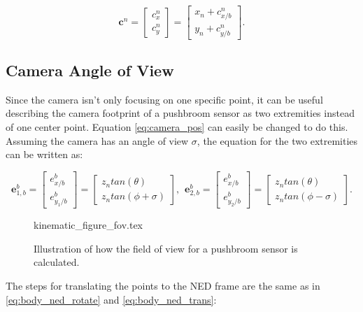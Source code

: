 \begin{equation} \label{eq:body_ned_trans}
	\bm{c}^n =
	\begin{bmatrix}
		c_x^n \\ c_y^n
	\end{bmatrix}
	=
	\begin{bmatrix}
		x_n + c_{x/b}^n \\
		y_n + c_{y/b}^n
	\end{bmatrix}.
\end{equation}

\subsection{Camera Angle of View}
Since the camera isn't only focusing on one specific point, it can be useful describing the camera footprint of a pushbroom sensor as two extremities instead of one center point. Equation \eqref{eq:camera_pos} can easily be changed to do this. Assuming the camera has an angle of view $\sigma$, the equation for the two extremities can be written as:

\begin{equation}
	\bm{e}_{1,b}^b = 
	\begin{bmatrix}
		e^b_{x/b} \\ e^b_{y_1/b}
	\end{bmatrix}
	=
	\begin{bmatrix}
		z_n tan(\theta)\\
		z_n tan(\phi + \sigma)
	\end{bmatrix}
	, \hspace{5pt}
	\bm{e}_{2,b}^b = 
	\begin{bmatrix}
		e^b_{x/b} \\ e^b_{y_2/b}
	\end{bmatrix}
	=
	\begin{bmatrix}
		z_n tan(\theta)\\
		z_n tan(\phi - \sigma)
	\end{bmatrix}.
\end{equation}

\begin{figure}
	{kinematic_figure_fov.tex}
	\caption{Illustration of how the field of view for a pushbroom sensor is calculated.}
	\label{fig:camera_kinematics_fov}
\end{figure}

The steps for translating the points to the NED frame are the same as in \eqref{eq:body_ned_rotate} and \eqref{eq:body_ned_trans}:


